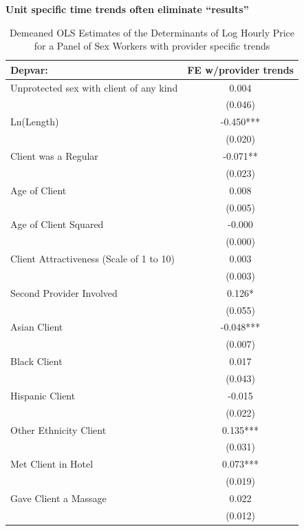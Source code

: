 \documentclass[notes=show]{beamer}
\begin{document}
\begin{frame}[plain]
	\begin{center}
	\textbf{Unit specific time trends often eliminate ``results''}
	\end{center}
	
\begin{table}[htbp]\centering
\tiny
\caption{Demeaned OLS Estimates of the Determinants of Log Hourly Price for a Panel of Sex Workers with provider specific trends}
\label{sasp}
\begin{center}
\begin{threeparttable}
\begin{tabular}{l*{1}{c}}
\toprule
\multicolumn{1}{l}{\textbf{Depvar:}}&
\multicolumn{1}{c}{\textbf{FE w/provider trends}}\\
\midrule
Unprotected sex with client of any kind&       0.004   \\
                    &     (0.046)   \\
Ln(Length)          &      -0.450***\\
                    &     (0.020)   \\
Client was a Regular&      -0.071** \\
                    &     (0.023)   \\
Age of Client       &       0.008   \\
                    &     (0.005)   \\
Age of Client Squared&      -0.000   \\
                    &     (0.000)   \\
Client Attractiveness (Scale of 1 to 10)&       0.003   \\
                    &     (0.003)   \\
Second Provider Involved&       0.126*  \\
                    &     (0.055)   \\
Asian Client        &      -0.048***\\
                    &     (0.007)   \\
Black Client        &       0.017   \\
                    &     (0.043)   \\
Hispanic Client     &      -0.015   \\
                    &     (0.022)   \\
Other Ethnicity Client&       0.135***\\
                    &     (0.031)   \\
Met Client in Hotel &       0.073***\\
                    &     (0.019)   \\
Gave Client a Massage&       0.022   \\
                    &     (0.012)   \\
\end{tabular}
\end{threeparttable}
\end{center}
\end{table}

	
 	
\end{frame}
\end{document}
